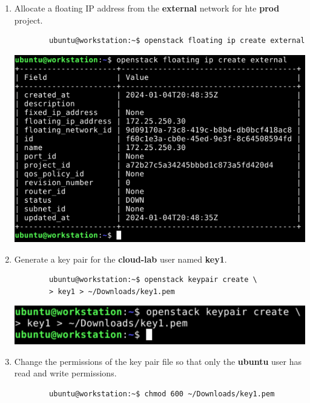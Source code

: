 \documentclass[letterpaper, 12pt]{article}
\begin{document}
\begin{enumerate}
    \item Allocate a floating IP address from the \textbf{external} network for hte \textbf{prod} project.
    \begin{lstlisting}
        ubuntu@workstation:~$ openstack floating ip create external
    \end{lstlisting}

    \begin{center}
        \includegraphics[width=\linewidth]{images/part1/step27.png}
    \end{center}

    \item Generate a key pair for the \textbf{cloud-lab} user named \textbf{key1}.
    \begin{lstlisting}
        ubuntu@workstation:~$ openstack keypair create \
        > key1 > ~/Downloads/key1.pem
    \end{lstlisting}

    \begin{center}
        \includegraphics[width=\linewidth]{images/part1/step28.png}
    \end{center}

    \item Change the permissions of the key pair file so that only the \textbf{ubuntu} user has read and write
    permissions.
    \begin{lstlisting}
        ubuntu@workstation:~$ chmod 600 ~/Downloads/key1.pem
    \end{lstlisting}


\end{enumerate}
\end{document}
